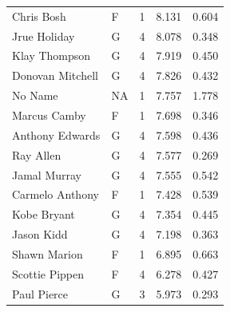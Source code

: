\begin{table}[t]
\begin{tabular*}{\linewidth}{@{\extracolsep{\fill}}llcrr}
Chris Bosh & F & 1 & 8.131 & 0.604 \\ 
Jrue Holiday & G & 4 & 8.078 & 0.348 \\ 
Klay Thompson & G & 4 & 7.919 & 0.450 \\ 
Donovan Mitchell & G & 4 & 7.826 & 0.432 \\ 
No Name & NA & 1 & 7.757 & 1.778 \\ 
Marcus Camby & F & 1 & 7.698 & 0.346 \\ 
Anthony Edwards & G & 4 & 7.598 & 0.436 \\ 
Ray Allen & G & 4 & 7.577 & 0.269 \\ 
Jamal Murray & G & 4 & 7.555 & 0.542 \\ 
Carmelo Anthony & F & 1 & 7.428 & 0.539 \\ 
Kobe Bryant & G & 4 & 7.354 & 0.445 \\ 
Jason Kidd & G & 4 & 7.198 & 0.363 \\ 
Shawn Marion & F & 1 & 6.895 & 0.663 \\ 
Scottie Pippen & F & 4 & 6.278 & 0.427 \\ 
Paul Pierce & G & 3 & 5.973 & 0.293 \\ 
\bottomrule
\end{tabular*}
\end{table}

